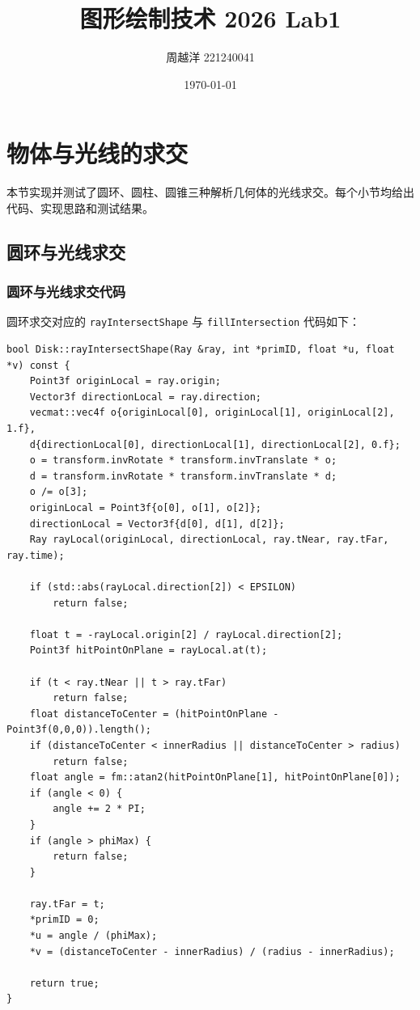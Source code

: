 \documentclass{article}
\title{图形绘制技术 2026 Lab1}
\author{周越洋 221240041}
\date{\today}
\begin{document}

\maketitle

\section{物体与光线的求交}

本节实现并测试了圆环、圆柱、圆锥三种解析几何体的光线求交。每个小节均给出代码、实现思路和测试结果。

\subsection{圆环与光线求交}

\subsubsection{圆环与光线求交代码}

圆环求交对应的 \texttt{rayIntersectShape} 与 \texttt{fillIntersection} 代码如下：
\begin{lstlisting}[style=cppstyle]
bool Disk::rayIntersectShape(Ray &ray, int *primID, float *u, float *v) const {
    Point3f originLocal = ray.origin;
    Vector3f directionLocal = ray.direction;
    vecmat::vec4f o{originLocal[0], originLocal[1], originLocal[2], 1.f},
    d{directionLocal[0], directionLocal[1], directionLocal[2], 0.f};
    o = transform.invRotate * transform.invTranslate * o;
    d = transform.invRotate * transform.invTranslate * d;
    o /= o[3];
    originLocal = Point3f{o[0], o[1], o[2]};
    directionLocal = Vector3f{d[0], d[1], d[2]};
    Ray rayLocal(originLocal, directionLocal, ray.tNear, ray.tFar, ray.time);

    if (std::abs(rayLocal.direction[2]) < EPSILON)
        return false;

    float t = -rayLocal.origin[2] / rayLocal.direction[2];
    Point3f hitPointOnPlane = rayLocal.at(t);

    if (t < ray.tNear || t > ray.tFar)
        return false;
    float distanceToCenter = (hitPointOnPlane - Point3f(0,0,0)).length();
    if (distanceToCenter < innerRadius || distanceToCenter > radius)
        return false;
    float angle = fm::atan2(hitPointOnPlane[1], hitPointOnPlane[0]);
    if (angle < 0) {
        angle += 2 * PI;
    }
    if (angle > phiMax) {
        return false;
    }

    ray.tFar = t;
    *primID = 0;
    *u = angle / (phiMax);
    *v = (distanceToCenter - innerRadius) / (radius - innerRadius);

    return true;
}
\end{lstlisting}
\end{document}
